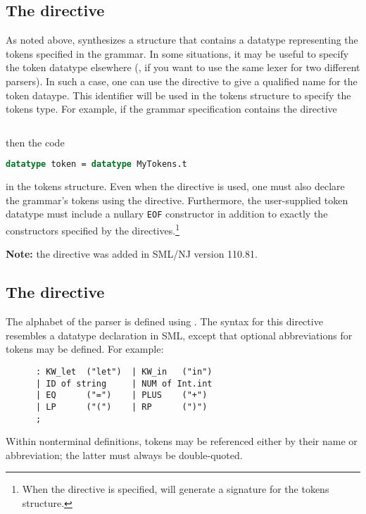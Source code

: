 \subsection{The  directive}

As noted above, \mlantlr{} synthesizes a structure that contains a datatype representing the
tokens specified in the grammar.
In some situations, it may be useful to specify the token datatype elsewhere (\eg{}, if you
want to use the same lexer for two different parsers).
In such a case, one can use the  directive to give a qualified name for the token
dataype.
This identifier will be used in the tokens structure to specify the tokens type.
For example, if the grammar specification contains the directive
\begin{lstlisting}[language=MLAntlr]
    %tokentype MyTokens.t;
\end{lstlisting}%
then the code
\begin{lstlisting}[language=SML]
    datatype token = datatype MyTokens.t
\end{lstlisting}%
in the tokens structure.
Even when the  directive is used, one must also declare the grammar's tokens
using the  directive.
Furthermore, the user-supplied token datatype must include a nullary \texttt{EOF} constructor
in addition to exactly the constructors specified by the  directives.\footnote{
  When the  directive is specified, \mlantlr{} will generate a signature for
  the tokens structure.
}

\noindent{}\textbf{Note:} the  directive was added in SML/NJ version 110.81.

\subsection{The  directive}

The alphabet of the parser is defined using .  The syntax for this directive resembles a datatype declaration in SML, except that optional abbreviations for tokens may be defined.  For example:
\begin{lstlisting}[language=MLAntlr]
    %tokens
      : KW_let  ("let")  | KW_in   ("in")
      | ID of string     | NUM of Int.int
      | EQ      ("=")    | PLUS    ("+")
      | LP      ("(")    | RP      (")")
      ;
\end{lstlisting}%
Within nonterminal definitions, tokens may be referenced either by their name or abbreviation; the latter must always be double-quoted.

